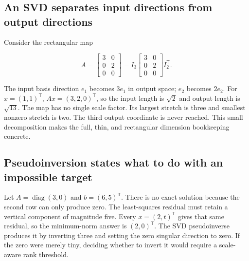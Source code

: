 \subsection{An SVD separates input directions from output directions}\label{02-foundations-ii-ch038-an-svd-separates-input-directions-from-output-directions}

\hypertarget{02-foundations-ii-ch038-an-svd-separates-input-directions-from-output-directions}{}

Consider the rectangular map

\[
A=\begin{bmatrix}3&0\\0&2\\0&0\end{bmatrix}
=I_3\begin{bmatrix}3&0\\0&2\\0&0\end{bmatrix}I_2^\mathsf T.
\]

The input basis direction \(e_1\) becomes \(3e_1\) in output space; \(e_2\) becomes \(2e_2\). For \(x=(1,1)^\mathsf T\), \(Ax=(3,2,0)^\mathsf T\), so the input length is \(\sqrt2\) and output length is \(\sqrt{13}\). The map has no single scale factor. Its largest stretch is three and smallest nonzero stretch is two. The third output coordinate is never reached. This small decomposition makes the full, thin, and rectangular dimension bookkeeping concrete.

\subsection{Pseudoinversion states what to do with an impossible target}\label{02-foundations-ii-ch038-pseudoinversion-states-what-to-do-with-an-impossible-target}

\hypertarget{02-foundations-ii-ch038-pseudoinversion-states-what-to-do-with-an-impossible-target}{}

Let \(A=\operatorname{diag}(3,0)\) and \(b=(6,5)^\mathsf T\). There is no exact solution because the second row can only produce zero. The least-squares residual must retain a vertical component of magnitude five. Every \(x=(2,t)^\mathsf T\) gives that same residual, so the minimum-norm answer is \((2,0)^\mathsf T\). The SVD pseudoinverse produces it by inverting three and setting the zero singular direction to zero. If the zero were merely tiny, deciding whether to invert it would require a scale-aware rank threshold.

